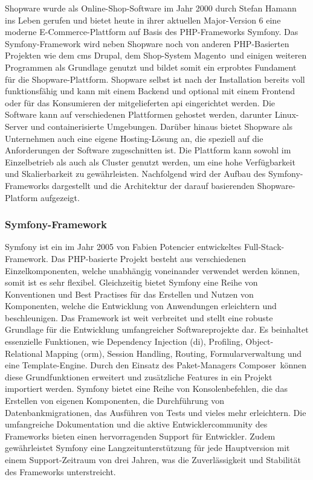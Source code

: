 Shopware wurde als Online-Shop-Software im Jahr 2000 durch Stefan Hamann ins Leben gerufen
und bietet heute in ihrer aktuellen Major-Version 6 eine moderne E-Commerce-Plattform auf Basis des PHP-Frameworks
\glqq Symfony\grqq.
Das Symfony-Framework wird neben Shopware noch von anderen PHP-Basierten Projekten wie dem \acrshort{cms}
\glqq Drupal\grqq, dem Shop-System \glqq Magento\grqq\ und einigen weiteren Programmen
als Grundlage genutzt und bildet somit ein erprobtes Fundament für die Shopware-Plattform.
Shopware selbst ist nach der Installation bereits voll funktionsfähig und kann mit einem Backend und optional
mit einem Frontend oder für das Konsumieren der mitgelieferten \acrshort{api} eingerichtet werden.
Die Software kann auf verschiedenen Plattformen gehostet werden, darunter Linux-Server und containerisierte Umgebungen.
Darüber hinaus bietet Shopware als Unternehmen auch eine eigene Hosting-Lösung an, die speziell auf die Anforderungen
der Software zugeschnitten ist.
Die Plattform kann sowohl im Einzelbetrieb als auch als Cluster genutzt werden, um eine hohe Verfügbarkeit und
Skalierbarkeit zu gewährleisten.
Nachfolgend wird der Aufbau des Symfony-Frameworks dargestellt und die Architektur der darauf basierenden
Shopware-Platform aufgezeigt.

\subsubsection{Symfony-Framework}

Symfony ist ein im Jahr 2005 von Fabien Potencier entwickeltes Full-Stack-Framework.
Das PHP-basierte Projekt besteht aus verschiedenen Einzelkomponenten, welche unabhängig voneinander verwendet werden
können, somit ist es sehr flexibel.
Gleichzeitig bietet Symfony eine Reihe von Konventionen und Best Practises für das Erstellen und Nutzen von Komponenten,
welche die Entwicklung von Anwendungen erleichtern und beschleunigen.
Das Framework ist weit verbreitet und stellt eine robuste Grundlage für die Entwicklung umfangreicher Softwareprojekte
dar.
Es beinhaltet essenzielle Funktionen, wie Dependency Injection (\acrshort{di}), Profiling, Object-Relational Mapping
(\acrshort{orm}), Session Handling, Routing, Formularverwaltung und eine Template-Engine.
Durch den Einsatz des Paket-Managers \glqq Composer\grqq\ können diese Grundfunktionen erweitert und zusätzliche
Features in ein Projekt importiert werden.
Symfony bietet eine Reihe von Konsolenbefehlen, die das Erstellen von eigenen Komponenten, die Durchführung von
Datenbankmigrationen, das Ausführen von Tests und vieles mehr erleichtern.
Die umfangreiche Dokumentation und die aktive Entwicklercommunity des Frameworks bieten einen hervorragenden Support
für Entwickler.
Zudem gewährleistet Symfony eine Langzeitunterstützung für jede Hauptversion mit einem Support-Zeitraum von drei Jahren,
was die Zuverlässigkeit und Stabilität des Frameworks unterstreicht.

